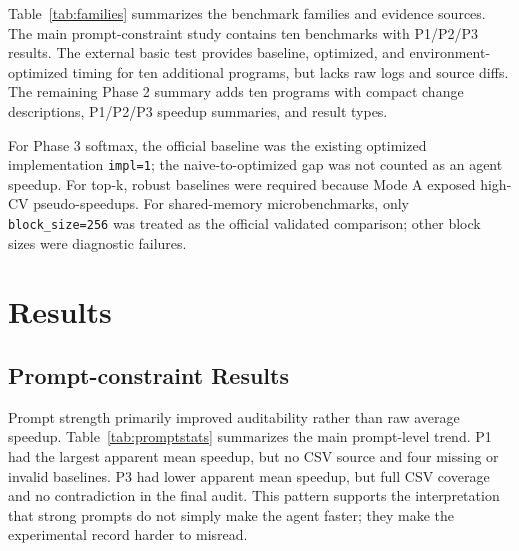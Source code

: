 \documentclass[conference]{IEEEtran}
\begin{document}
Table~\ref{tab:families} summarizes the benchmark families and evidence sources. The main prompt-constraint study contains ten benchmarks with P1/P2/P3 results. The external basic test provides baseline, optimized, and environment-optimized timing for ten additional programs, but lacks raw logs and source diffs. The remaining Phase 2 summary adds ten programs with compact change descriptions, P1/P2/P3 speedup summaries, and result types.

\begin{table}[t]
\centering
\caption{Benchmark families and evidence sources.}
\label{tab:families}
\footnotesize
{}
\end{table}

For Phase 3 softmax, the official baseline was the existing optimized implementation \texttt{impl=1}; the naive-to-optimized gap was not counted as an agent speedup. For top-k, robust baselines were required because Mode A exposed high-CV pseudo-speedups. For shared-memory microbenchmarks, only \texttt{block\_size=256} was treated as the official validated comparison; other block sizes were diagnostic failures.

\section{Results}
\label{sec:results}

\subsection{Prompt-constraint Results}

Prompt strength primarily improved auditability rather than raw average speedup. Table~\ref{tab:promptstats} summarizes the main prompt-level trend. P1 had the largest apparent mean speedup, but no CSV source and four missing or invalid baselines. P3 had lower apparent mean speedup, but full CSV coverage and no contradiction in the final audit. This pattern supports the interpretation that strong prompts do not simply make the agent faster; they make the experimental record harder to misread.
\end{document}
